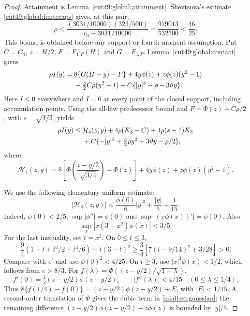 \documentclass[11pt,a4paper]{article}
\numberwithin{equation}{section}
\theoremstyle{definition}
\theoremstyle{remark}
\begin{document}
\begin{proof}
Attainment is Lemma~\ref{cut49:global:attainment}.
Shevtsova's estimate \eqref{cut49:global:finitecaps} gives, at this pair,
\[
 \rho<\frac{(3031/10000)(323/500)}{c_0-3031/10000}
       =\frac{979013}{532500}<\frac{46}{25}.
\]
This bound is obtained before any support or fourth-moment assumption.
Put $C=C_4$, $z=H/2$, $F=F_{4,P}(H)$ and $G=F_{3,P}$.
Lemma~\ref{cut49:global:contact} gives
\begin{align}
 \rho I(y)={}&8\{G(H-y)-F\}+4y\phi(z)+z\phi(z)(y^2-1)\notag\\
 &+\tfrac32C\rho(y^2-1)
   -C\{|y|^3-\rho-3\vartheta y\}.\label{n4all:eq:contact}
\end{align}
Here $I\le0$ everywhere and $I=0$ at every point of the closed
support, including accumulation points. Using the all-law predecessor
bound and $F=\Phi(z)+C\rho/2$, with $s=\sqrt{4/3}$, yields
\begin{align}
 \rho I(y)\le{}&\mathcal H_4(z,y)+4\rho(K_3-C)
                  +4\rho(s-1)K_3\notag\\
 &+C\{-|y|^3+\tfrac32\rho y^2+3\vartheta y-\rho/2\},
 \label{n4all:eq:predecessor}
\end{align}
where
\[
 \mathcal H_4(z,y)=
 8\left[\Phi\!\left(\frac{z-y/2}{\sqrt{3/4}}\right)-\Phi(z)\right]
 +4y\phi(z)+z\phi(z)(y^2-1).
\]

We use the following elementary uniform estimate:
\begin{equation}\label{n4all:eq:gaussian}
 |\mathcal H_4(z,y)|<\frac{\phi(0)}6|y|^3+\frac{|y|}{5}+\frac1{15}.
\end{equation}
Indeed, $\phi(0)<2/5$, $\sup|\phi''|=\phi(0)$ and
$\sup|(x\phi(x))'|=\phi(0)$. Also
\[
 \sup_x|x(3-x^2)\phi(x)|<3/5.
\]
For the last inequality, set $t=x^2$. On $0\le t\le3$,
\[
 \frac94(1+t+t^2/2+t^3/6)-t(3-t)^2
 \ge\frac34\left[7(t-9/14)^2+3/28\right]>0.
\]
Compare with $e^t$ and use $\phi(0)^2<4/25$.
On $t\ge3$, use $|x|^3\phi(x)<1/2$, which follows from $e>8/3$.
For $f(\lambda)=\Phi((z-y/2)/\sqrt{1-\lambda})$,
\[
 f'(0)=\tfrac12(z-y/2)\phi(z-y/2),\qquad
 |f''(\lambda)|<4/15\quad(0\le\lambda\le1/4).
\]
Thus $8\{f(1/4)-f(0)\}=(z-y/2)\phi(z-y/2)+E$, with
$|E|<1/15$. A second-order translation of $\Phi$ gives the cubic
term in \eqref{n4all:eq:gaussian}; the remaining difference
$(z-y/2)\phi(z-y/2)-z\phi(z)$ is bounded by $|y|/5$.


\end{proof}
\end{document}
